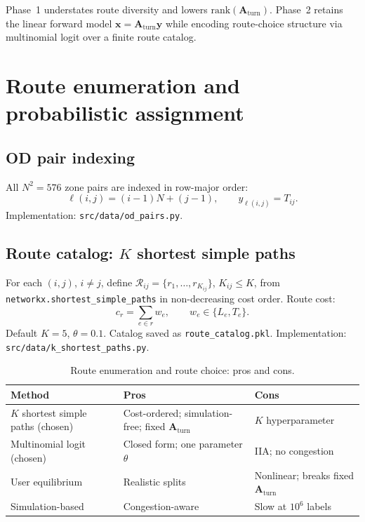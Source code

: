 \documentclass[11pt,a4paper]{report}
\newcommand{\mathbfy}{\mathbf{y}}
\newcommand{\mathbfx}{\mathbf{x}}
\newcommand{\Aturn}{\mathbf{A}_{\mathrm{turn}}}
\begin{document}
Phase~1 understates route diversity and lowers $\mathrm{rank}(\Aturn)$. Phase~2 retains the linear forward model $\mathbfx=\Aturn\mathbfy$ while encoding route-choice structure via multinomial logit over a finite route catalog.


\section{Route enumeration and probabilistic assignment}
\label{sec:ch2-routes}

\subsection{OD pair indexing}

All $N^2=576$ zone pairs are indexed in row-major order:
\begin{equation}
    \ell(i,j)=(i-1)N+(j-1), \qquad y_{\ell(i,j)}=T_{ij}.
    \label{eq:od_index}
\end{equation}
Implementation: \texttt{src/data/od\_pairs.py}.

\subsection{Route catalog: $K$ shortest simple paths}

For each $(i,j)$, $i\neq j$, define $\mathcal{R}_{ij}=\{r_1,\ldots,r_{K_{ij}}\}$, $K_{ij}\le K$, from \texttt{networkx.shortest\_simple\_paths} in non-decreasing cost order. Route cost:
\begin{equation}
    c_r = \sum_{e\in r} w_e, \qquad w_e \in \{L_e, T_e\}.
    \label{eq:route_cost}
\end{equation}
Default $K=5$, $\theta=0.1$. Catalog saved as \texttt{route\_catalog.pkl}. Implementation: \texttt{src/data/k\_shortest\_paths.py}.

\begin{table}[ht]
\centering
\caption{Route enumeration and route choice: pros and cons.}
\label{tab:route_methods}
\small
\begin{tabular}{@{}p{3.2cm}p{4.2cm}p{4.2cm}@{}}
\toprule
\textbf{Method} & \textbf{Pros} & \textbf{Cons} \\
\midrule
$K$ shortest simple paths (chosen) & Cost-ordered; simulation-free; fixed $\Aturn$ & $K$ hyperparameter \\
Multinomial logit (chosen) & Closed form; one parameter $\theta$ & IIA; no congestion \\
User equilibrium & Realistic splits & Nonlinear; breaks fixed $\Aturn$ \\
Simulation-based & Congestion-aware & Slow at $10^6$ labels \\
\bottomrule
\end{tabular}
\end{table}
\end{document}
